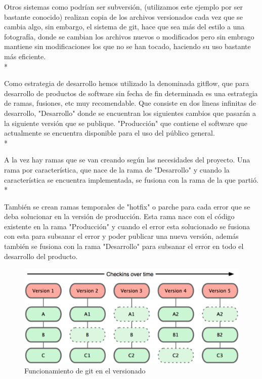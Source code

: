 \documentclass[../pfc.tex]{subfiles}
\begin{document}
	Otros sistemas como podrían ser subversión, (utilizamos este ejemplo por ser bastante conocido) realizan copia de los archivos versionados cada vez que se cambia algo, sin embargo, el sistema de git, hace que sea más del estilo a una fotografía, donde se cambian los archivos nuevos o modificados pero sin embrago mantiene sin modificaciones los que no se han tocado, haciendo su uso bastante más eficiente\cite{funcgit2}.\\*
	
	Como estrategia de desarrollo hemos utilizado la denominada gitflow, que para desarrollo de productos de software sin fecha de fin determinada es una estrategia de ramas, fusiones, etc muy recomendable. Que consiste en dos lineas infinitas de desarrollo, "Desarrollo" donde se encuentran los siguientes cambios que pasarán a la siguiente versión que se publique. "Producción" que contiene el software que actualmente se encuentra disponible para el uso del público general.\\*
	
	A la vez hay ramas que se van creando según las necesidades del proyecto. Una rama por característica, que nace de la rama de "Desarrollo" y cuando la característica se encuentra implementada, se fusiona con la rama de la que partió. \\*
	
	También se crean ramas temporales de "hotfix" o parche para cada error que se deba solucionar en la versión de producción. Esta rama nace con el código existente en la rama "Producción" y cuando el error esta solucionado se fusiona con esta para subsanar el error y poder publicar una nueva versión, además también se fusiona con la rama "Desarrollo" para subsanar el error en todo el desarrollo del producto.
	
	\begin{figure}[H]
	\centering
	\includegraphics[width=0.7\linewidth]{../images/funcionamiento_git}
	\caption{Funcionamiento de git en el versionado}
	\label{fig:funcionamiento_git}
	\end{figure}
\end{document}
